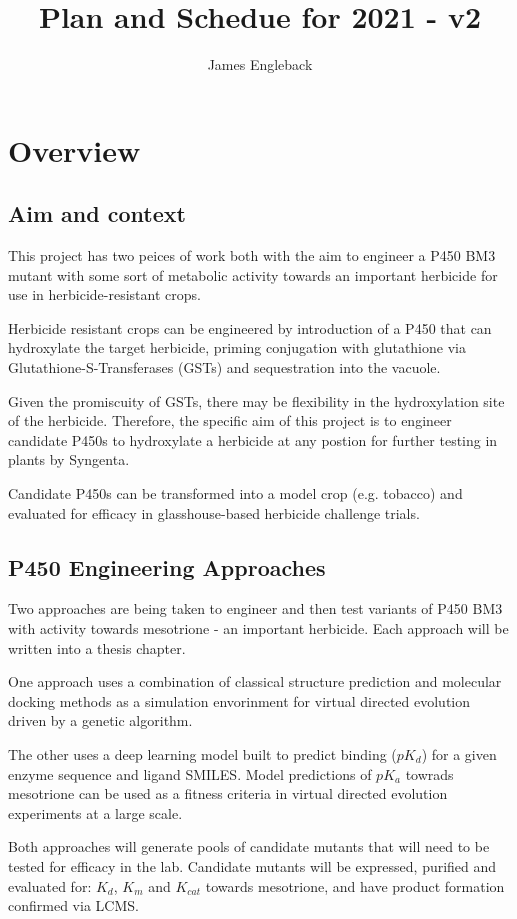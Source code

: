 \documentclass{article}
\begin{document}
\title{\textbf{Plan and Schedue for 2021 - v2}}
\author{James Engleback}
\maketitle
\tableofcontents

\section{Overview}
\subsection{Aim and context}
This project has two peices of work both with the aim to engineer a P450 BM3 mutant with some sort of metabolic activity towards an important herbicide for use in herbicide-resistant crops. %
\par
Herbicide resistant crops can be engineered by introduction of a P450 that can hydroxylate the target herbicide, priming conjugation with glutathione via Glutathione-S-Transferases (GSTs) and sequestration into the vacuole.
\par
Given the promiscuity of GSTs, there may be flexibility in the hydroxylation site of the herbicide. Therefore, the specific aim of this project is to engineer candidate P450s to hydroxylate a herbicide at any postion for further testing in plants by Syngenta. %
\par
Candidate P450s can be transformed into a model crop (e.g. tobacco) and evaluated for efficacy in glasshouse-based herbicide challenge trials.  %
\par
\subsection{P450 Engineering Approaches}
Two approaches are being taken to engineer and then test variants of P450 BM3 with activity towards mesotrione - an important herbicide. Each approach will be written into a thesis chapter. %
\par
One approach uses a combination of classical structure prediction and molecular docking methods as a simulation envorinment for virtual directed evolution driven by a genetic algorithm. %
\par
The other uses a deep learning model built to predict binding ($pK_d$) for a given enzyme sequence and ligand SMILES. Model predictions of $pK_a$ towrads mesotrione can be used as a fitness criteria in virtual directed evolution experiments at a large scale.%
\par
Both approaches will generate pools of candidate mutants that will need to be tested for efficacy in the lab. Candidate mutants will be expressed, purified and evaluated for: $K_d$, $K_m$ and $K_{cat}$ towards mesotrione, and have product formation confirmed via LCMS. %
\end{document}

